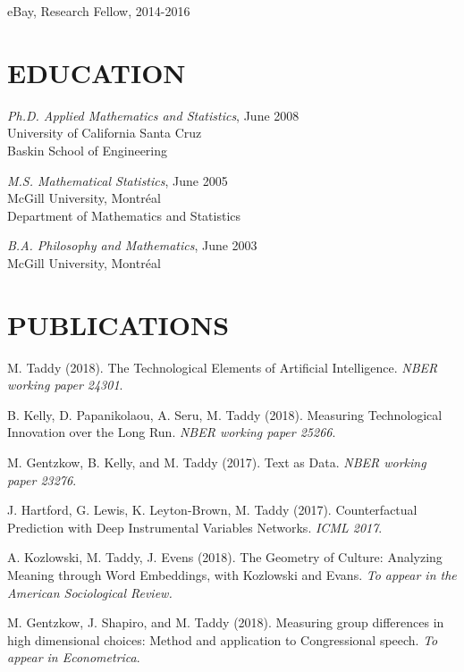 \documentclass[margin,line]{res}
\begin{document}
\begin{resume}
\vspace{-.2cm}
{\sc eBay}, Research Fellow, 2014-2016

\medskip
\section{\bf EDUCATION}

{\it Ph.D. Applied Mathematics and Statistics}, June 2008\\
{\sc University of California Santa Cruz}\\
Baskin School of Engineering

\vspace{-0.2cm}
{\it M.S. Mathematical Statistics}, June 2005\\
{\sc McGill University, Montr\'eal}\\
 Department of Mathematics and Statistics

\vspace{-0.2cm}
{\it B.A. Philosophy and Mathematics}, June 2003\\
{\sc McGill University, Montr\'eal}

\medskip
\section{\bf PUBLICATIONS}

M. Taddy (2018).  The Technological Elements of Artificial Intelligence. {\em NBER working paper 24301}.

B. Kelly, D. Papanikolaou, A. Seru, M. Taddy (2018).  Measuring Technological Innovation over the Long Run.
{\em NBER working paper 25266}.

M. Gentzkow, B. Kelly, and M. Taddy (2017).  Text as Data. {\em NBER working paper 23276}.

J. Hartford, G. Lewis, K. Leyton-Brown, M. Taddy (2017).  Counterfactual Prediction with Deep Instrumental Variables Networks.  {\it ICML 2017}.

A. Kozlowski, M. Taddy, J. Evens (2018).  The Geometry of Culture: Analyzing Meaning through Word Embeddings, with Kozlowski and Evans. {\it To appear in the American Sociological Review.}

M. Gentzkow, J. Shapiro, and M. Taddy (2018).  Measuring group differences in high dimensional choices: Method and application to Congressional speech. {\em To appear in Econometrica}.


\end{resume}
\end{document}
